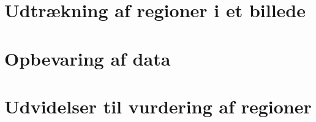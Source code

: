 {\section{Udtrækning af regioner i et billede\label{section_udtraek}}


\section{Opbevaring af data\label{section_database}}


\section{Udvidelser til vurdering af regioner}


}

